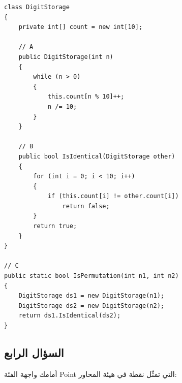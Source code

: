 \documentclass[14pt]{extarticle}
\begin{document}
\ifwithsols
{\small
\begin{boxSolution}
\begin{english}
\begin{verbatim}
class DigitStorage
{
    private int[] count = new int[10];

    // A
    public DigitStorage(int n)
    {
        while (n > 0)
        {
            this.count[n % 10]++;
            n /= 10;
        }
    }

    // B
    public bool IsIdentical(DigitStorage other)
    {
        for (int i = 0; i < 10; i++)
        {
            if (this.count[i] != other.count[i])
                return false;
        }
        return true;
    }
}

// C
public static bool IsPermutation(int n1, int n2)
{
    DigitStorage ds1 = new DigitStorage(n1);
    DigitStorage ds2 = new DigitStorage(n2);
    return ds1.IsIdentical(ds2);
}
\end{verbatim}
\end{english}
\end{boxSolution}
}
\fi

\clearpage
\subsection*{السؤال الرابع}

أمامك واجهة الفئة \textenglish{Point} التي تمثّل نقطة في هيئة المحاور:
\end{document}
